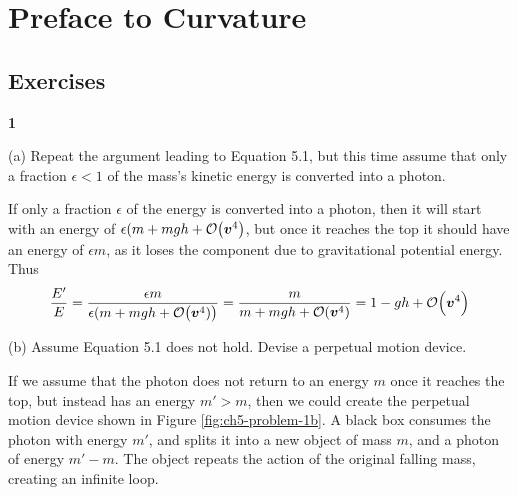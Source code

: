 \message{ !name(gr-ch5-notes.tex)}\documentclass[gr-notes.tex]{subfiles}
\begin{document}


\setcounter{chapter}{4}

\chapter{Preface to Curvature}

\setcounter{section}{7}

\section{Exercises}

\textbf{1}

(a)
Repeat the argument leading to Equation 5.1, but this time assume that only a fraction $\epsilon < 1$ of the mass's kinetic energy is converted into a photon.

If only a fraction $\epsilon$ of the energy is converted into a photon, then it will start with an energy of $\epsilon (m + mgh + \order{\boldsymbol{v}^4}$, but once it reaches the top it should have an energy of $\epsilon m$, as it loses the component due to gravitational potential energy. Thus
%
\begin{displaymath}
  \frac{E'}{E} =
  \frac{\epsilon m}{\epsilon (m + mgh + \order{\boldsymbol{v}^4)}} =
  \frac{m}{m + mgh + \order{\boldsymbol{v}^4}} =
  1 - gh + \order{\boldsymbol{v}^4}
\end{displaymath}

(b)
Assume Equation 5.1 does not hold. Devise a perpetual motion device.

If we assume that the photon does not return to an energy $m$ once it reaches the top, but instead has an energy $m' > m$, then we could create the perpetual motion device shown in Figure \ref{fig:ch5-problem-1b}. A black box consumes the photon with energy $m'$, and splits it into a new object of mass $m$, and a photon of energy $m' - m$. The object repeats the action of the original falling mass, creating an infinite loop.
\end{document}
